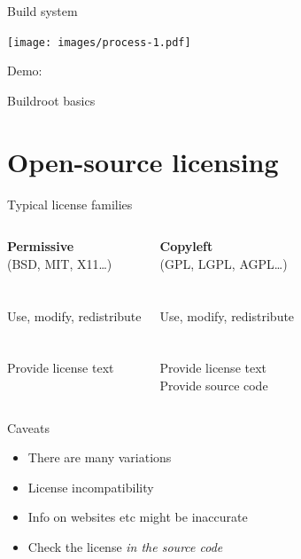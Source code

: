 \documentclass[xetex,table,table]{beamer}
\begin{document}
\begin{frame}{Build system}
  \begin{center}
    \texttt{[image: images/process-1.pdf]}
  \end{center}
\end{frame}

\begin{frame}[standout]
  Demo:

  Buildroot basics
\end{frame}


\section{Open-source licensing}

\begin{frame}{Typical license families}
  \begin{columns}

      \begin{center}
        {\bf Permissive}\\
        (BSD, MIT, X11\dots)\\
      {\ }\\
      \faCheckCircle\\
      Use, modify, redistribute\\
      {\ }\\
      \faExclamationCircle\\
      Provide license text \\
      {\ }
      \end{center}

      \begin{center}
        {\bf Copyleft} \\
        (GPL, LGPL, AGPL\dots)\\
      {\ }\\
      \faCheckCircle\\
      Use, modify, redistribute\\
      {\ }\\
      \faExclamationCircle\\
      Provide license text \\
      Provide source code
      \end{center}

  \end{columns}
\end{frame}

\begin{frame}{Caveats}
  \begin{itemize}
  \item There are many variations
  \item License incompatibility
  \item Info on websites etc might be inaccurate
  \item[\textrightarrow] Check the license {\em in the source code}
  \end{itemize}
\end{frame}
\end{document}
